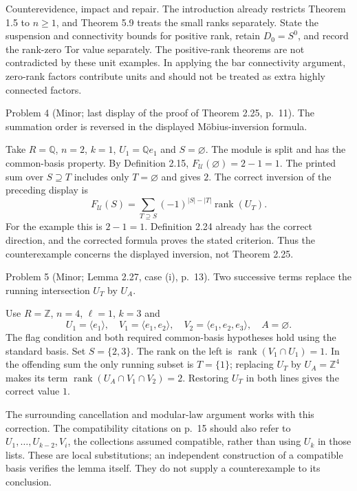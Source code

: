 \documentclass[10pt]{article}
\begin{document}
Counterevidence, impact and repair. The introduction already restricts Theorem 1.5 to \(n\ge1\), and Theorem 5.9 treats the small ranks separately. State the suspension and connectivity bounds for positive rank, retain \(D_0=S^0\), and record the rank-zero Tor value separately. The positive-rank theorems are not contradicted by these unit examples. In applying the bar connectivity argument, zero-rank factors contribute units and should not be treated as extra highly connected factors.\par
Problem 4 (Minor; last display of the proof of Theorem 2.25, p. 11).  The summation order is reversed in the displayed Möbius-inversion formula.\par
Take \(R=\mathbb Q\), \(n=2\), \(k=1\), \(U_1=\mathbb Qe_1\) and \(S=\varnothing\). The module is split and has the common-basis property. By Definition 2.15, \(F_{\mathcal U}(\varnothing)=2-1=1\). The printed sum over \(S\supseteq T\) includes only \(T=\varnothing\) and gives \(2\). The correct inversion of the preceding display is \[F_{\mathcal U}(S)=\sum_{T\supseteq S}
 (-1)^{|S|-|T|}\operatorname{rank}(U_T).\] For the example this is \(2-1=1\). Definition 2.24 already has the correct direction, and the corrected formula proves the stated criterion. Thus the counterexample concerns the displayed inversion, not Theorem 2.25.\par
Problem 5 (Minor; Lemma 2.27, case (i), p. 13).  Two successive terms replace the running intersection \(U_T\) by \(U_A\).\par
Use \(R=\mathbb Z\), \(n=4\), \(\ell=1\), \(k=3\) and \[U_1=\langle e_1\rangle,\quad
 V_1=\langle e_1,e_2\rangle,\quad
 V_2=\langle e_1,e_2,e_3\rangle,\quad A=\varnothing.\] The flag condition and both required common-basis hypotheses hold using the standard basis. Set \(S=\{2,3\}\). The rank on the left is \(\operatorname{rank}(V_1\cap U_1)=1\). In the offending sum the only running subset is \(T=\{1\}\); replacing \(U_T\) by \(U_A=\mathbb Z^4\) makes its term \(\operatorname{rank}(U_A\cap V_1\cap V_2)=2\). Restoring \(U_T\) in both lines gives the correct value \(1\).\par
The surrounding cancellation and modular-law argument works with this correction. The compatibility citations on p. 15 should also refer to \(U_1,\ldots,U_{k-2},V_i\), the collections assumed compatible, rather than using \(U_k\) in those lists. These are local substitutions; an independent construction of a compatible basis verifies the lemma itself. They do not supply a counterexample to its conclusion.\par
\end{document}
